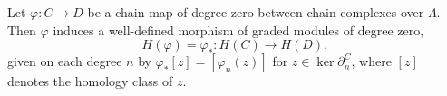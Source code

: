 Let $\varphi: C \rightarrow D$ be a chain map of degree zero between chain complexes over $\Lambda$. Then $\varphi$ induces a well-defined morphism of graded modules of degree zero,
$$
H(\varphi) = \varphi_*: H(C) \longrightarrow H(D),
$$
given on each degree $n$ by $\varphi_*[z] = [\varphi_n(z)]$ for $z \in \ker \partial_n^C$, where $[z]$ denotes the homology class of $z$.
